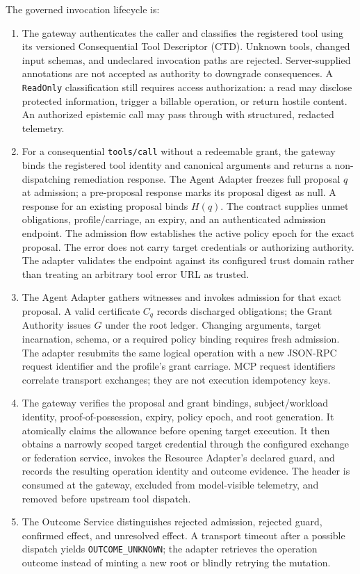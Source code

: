 The governed invocation lifecycle is:
\begin{enumerate}
\item The gateway authenticates the caller and classifies the registered tool using its versioned Consequential Tool Descriptor (CTD). Unknown tools, changed input schemas, and undeclared invocation paths are rejected. Server-supplied annotations are not accepted as authority to downgrade consequences. A \texttt{ReadOnly} classification still requires access authorization: a read may disclose protected information, trigger a billable operation, or return hostile content. An authorized epistemic call may pass through with structured, redacted telemetry.
\item For a consequential \texttt{tools/call} without a redeemable grant, the gateway binds the registered tool identity and canonical arguments and returns a non-dispatching remediation response. The Agent Adapter freezes full proposal $q$ at admission; a pre-proposal response marks its proposal digest as null. A response for an existing proposal binds $H(q)$. The contract supplies unmet obligations, profile/carriage, an expiry, and an authenticated admission endpoint. The admission flow establishes the active policy epoch for the exact proposal. The error does not carry target credentials or authorizing authority. The adapter validates the endpoint against its configured trust domain rather than treating an arbitrary tool error URL as trusted.
\item The Agent Adapter gathers witnesses and invokes admission for that exact proposal. A valid certificate $C_q$ records discharged obligations; the Grant Authority issues $G$ under the root ledger. Changing arguments, target incarnation, schema, or a required policy binding requires fresh admission. The adapter resubmits the same logical operation with a new JSON-RPC request identifier and the profile's grant carriage. MCP request identifiers correlate transport exchanges; they are not execution idempotency keys.
\item The gateway verifies the proposal and grant bindings, subject/workload identity, proof-of-possession, expiry, policy epoch, and root generation. It atomically claims the allowance before opening target execution. It then obtains a narrowly scoped target credential through the configured exchange or federation service, invokes the Resource Adapter's declared guard, and records the resulting operation identity and outcome evidence. The header is consumed at the gateway, excluded from model-visible telemetry, and removed before upstream tool dispatch.
\item The Outcome Service distinguishes rejected admission, rejected guard, confirmed effect, and unresolved effect. A transport timeout after a possible dispatch yields \texttt{OUTCOME\_UNKNOWN}; the adapter retrieves the operation outcome instead of minting a new root or blindly retrying the mutation.
\end{enumerate}


